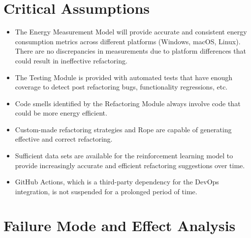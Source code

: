 \documentclass{article}
\begin{document}
\section{Critical Assumptions}

\begin{itemize}
    \item The Energy Measurement Model will provide accurate and consistent energy consumption metrics across different platforms (Windows, macOS, Linux). There are no discrepancies in measurements due to platform differences that could result in ineffective refactoring.
    \item The Testing Module is provided with automated tests that have enough coverage to detect post refactoring bugs, functionality regressions, etc.
    \item Code smells identified by the Refactoring Module always involve code that could be more energy efficient.
    \item Custom-made refactoring strategies and Rope are capable of generating effective and correct refactoring.
    \item Sufficient data sets are available for the reinforcement learning model to provide increasingly accurate and efficient refactoring suggestions over time.
    \item GitHub Actions, which is a third-party dependency for the DevOps integration, is not suspended for a prolonged period of time.
\end{itemize}

\section{Failure Mode and Effect Analysis}

\end{document}
